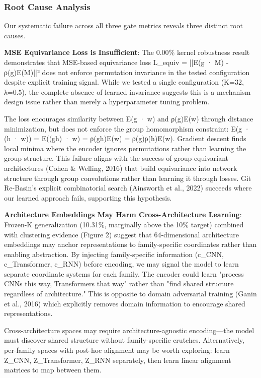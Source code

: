 
\subsubsection{Root Cause Analysis}

Our systematic failure across all three gate metrics reveals three distinct root causes.

\textbf{MSE Equivariance Loss is Insufficient}: The 0.00\% kernel robustness result demonstrates that MSE-based equivariance loss L_equiv = ||E(g · M) - ρ(g)E(M)||² does not enforce permutation invariance in the tested configuration despite explicit training signal. While we tested a single configuration (K=32, λ=0.5), the complete absence of learned invariance suggests this is a mechanism design issue rather than merely a hyperparameter tuning problem.

The loss encourages similarity between E(g · w) and ρ(g)E(w) through distance minimization, but does not enforce the group homomorphism constraint: E(g · (h · w)) = E((gh) · w) = ρ(gh)E(w) = ρ(g)ρ(h)E(w). Gradient descent finds local minima where the encoder ignores permutations rather than learning the group structure. This failure aligns with the success of group-equivariant architectures (Cohen \& Welling, 2016) that build equivariance into network structure through group convolutions rather than learning it through losses. Git Re-Basin's explicit combinatorial search (Ainsworth et al., 2022) succeeds where our learned approach fails, supporting this hypothesis.

\textbf{Architecture Embeddings May Harm Cross-Architecture Learning}: Frozen-K generalization (10.31\%, marginally above the 10\% target) combined with clustering evidence (Figure 2) suggest that 64-dimensional architecture embeddings may anchor representations to family-specific coordinates rather than enabling abstraction. By injecting family-specific information (c_CNN, c_Transformer, c_RNN) before encoding, we may signal the model to learn separate coordinate systems for each family. The encoder could learn "process CNNs this way, Transformers that way" rather than "find shared structure regardless of architecture." This is opposite to domain adversarial training (Ganin et al., 2016) which explicitly removes domain information to encourage shared representations.

Cross-architecture spaces may require architecture-agnostic encoding—the model must discover shared structure without family-specific crutches. Alternatively, per-family spaces with post-hoc alignment may be worth exploring: learn Z_CNN, Z_Transformer, Z_RNN separately, then learn linear alignment matrices to map between them.

